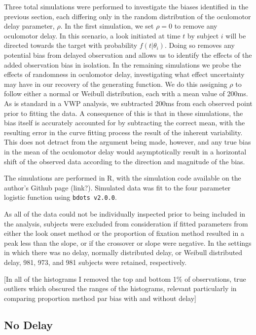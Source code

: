\documentclass{article}
\newcommand{\xt}{\texttt}%
\begin{document}
Three total simulations were performed to investigate the biases identified in the previous section, each differing only in the random distribution of the oculomotor delay parameter, $\rho$. In the first simulation, we set $\rho = 0$ to remove any oculomotor delay. In this scenario, a look initiated at time $t$ by subject $i$ will be directed towards the target with probability $f(t|\theta_i)$. Doing so removes any potential bias from delayed observation and allows us to identify the effects of the added observation bias in isolation. In the remaining simulations we probe the effects of randomness in oculomotor delay, investigating what effect uncertainty may have in our recovery of the generating function. We do this assigning $\rho$ to follow either a normal or Weibull distribution, each with a mean value of 200ms. As is standard in a VWP analysis, we subtracted 200ms from each observed point prior to fitting the data. A consequence of this is that in these simulations, the bias itself is accurately accounted for by subtracting the correct mean, with the resulting error in the curve fitting process the result of the inherent variability. This does not detract from the argument being made, however, and any true bias in the mean of the oculomotor delay would asymptotically result in a horizontal shift of the observed data according to the direction and magnitude of the bias.

The simulations are performed in R, with the simulation code available on the author's Github page (link?). Simulated data was fit to the four parameter logistic function using \xt{bdots v2.0.0}.

As all of the data could not be individually inspected prior to being included in the analysis, subjects were excluded from consideration if fitted parameters from either the look onset method or the proportion of fixation method resulted in a peak less than the slope, or if the crossover or slope were negative. In the settings in which there was no delay, normally distributed delay, or Weibull distributed delay, 981, 973, and 981 subjects were retained, respectively.

[In all of the histograms I removed the top and bottom 1\% of observations, true outliers which obscured the ranges of the histograms, relevant particularly in comparing proportion method  par bias with and without delay]

\subsection{No Delay}
\end{document}
